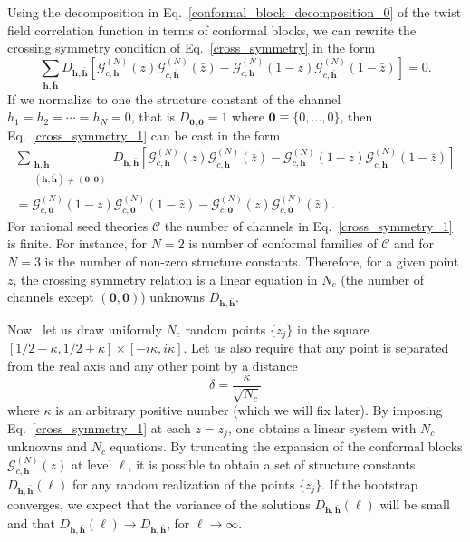 \documentclass[a4paper,11pt]{article}
\begin{document}
Using the decomposition in Eq.~\eqref{conformal_block_decomposition_0} of the twist field correlation function in terms of conformal
blocks, we can rewrite the crossing symmetry condition of Eq.~\eqref{cross_symmetry} in the form
\begin{equation}\label{cross_symmetry_1}
 \sum_{\boldsymbol{h}, \boldsymbol{\bar{h}}} D_{\boldsymbol{h}, \boldsymbol{\bar{h}}}\left[
 \mathcal{G}_{c, \boldsymbol{h}}^{(N)}(z)\mathcal{G}_{c, \boldsymbol{\bar{h}}}^{(N)}(\bar{z})-
 \mathcal{G}_{c, \boldsymbol{h}}^{(N)}(1-z)\mathcal{G}_{c, \boldsymbol{\bar{h}}}^{(N)}(1-\bar{z})\right]=0.
\end{equation}
If we normalize to one the structure constant of the channel $h_1=h_2=\cdots=h_N=0$, that is $D_{\boldsymbol{0}, \boldsymbol{0}}=1$
where $\boldsymbol{0}\equiv \{0,\dots, 0\}$, then Eq.~\eqref{cross_symmetry_1} can be cast in the form
\begin{multline}\label{cross_symmetry_2}
\sum_{\substack{\boldsymbol{h},\boldsymbol{\bar{h}} \\ (\boldsymbol{h},\boldsymbol{\bar{h}})\neq(\boldsymbol{0},\boldsymbol{0})}}D_{\boldsymbol{h},\boldsymbol{\bar{h}}}
 \left[\mathcal{G}_{c,\boldsymbol{h}}^{(N)}(z)\mathcal{G}_{c, \boldsymbol{\bar{h}}}^{(N)}(\bar{z})-
 \mathcal{G}_{c,\boldsymbol{h}}^{(N)}(1-z)\mathcal{G}_{c,\boldsymbol{\bar{h}}}^{(N)}(1-\bar{z})\right]
 \\=\mathcal{G}_{c,\boldsymbol{0}}^{(N)}(1-z)\mathcal{G}_{c, \boldsymbol{0}}^{(N)}(1-\bar{z})-
 \mathcal{G}_{c,\boldsymbol{0}}^{(N)}(z)\mathcal{G}_{c,\boldsymbol{0}}^{(N)}(\bar{z}).
\end{multline}
For rational seed theories $\mathcal{C}$ the number of channels in Eq.~\eqref{cross_symmetry_1} is finite. For instance, for $N=2$ is number of conformal families of $\mathcal{C}$ and for $N=3$ is the number of non-zero structure constants. 
Therefore, 
for a given point $z$, the crossing symmetry relation is a linear equation in  $N_c$ (the number 
of channels except $(\boldsymbol{0}, \boldsymbol{0})$) unknowns $D_{\boldsymbol{h},\boldsymbol{\bar{h}}}$.

Now~\cite{SR} let us draw uniformly $N_c$ random points $\{z_{j}\}$ in the square $[1/2-\kappa, 1/2+\kappa]\times[-i\kappa, i\kappa]$. Let us also require that any point is separated from the real axis and any other point by a distance 
\begin{equation}
 \delta=\frac{\kappa}{\sqrt{N_c}}
\end{equation}
where $\kappa$ is an arbitrary positive number (which we will fix later). By imposing Eq.~\eqref{cross_symmetry_1} at each $z=z_j$, one obtains a linear system with $N_c$ unknowns and $N_c$ equations. By truncating the expansion of the conformal blocks $\mathcal{G}_{c, \boldsymbol{h}}^{(N)}(z)$
at level $\ell$, it is possible to obtain a set of structure constants $D_{\boldsymbol{h},\boldsymbol{\bar{h}}}(\ell)$ for any random realization of the points $\{z_j\}$. If the bootstrap converges,  we expect that the variance of the solutions $D_{\boldsymbol{h},\boldsymbol{\bar{h}}}(\ell)$ will be small and that $D_{\boldsymbol{h},\boldsymbol{\bar{h}}}(\ell)\to D_{\boldsymbol{h},\boldsymbol{\bar{h}}}$, for $\ell\to \infty$. 
\end{document}
